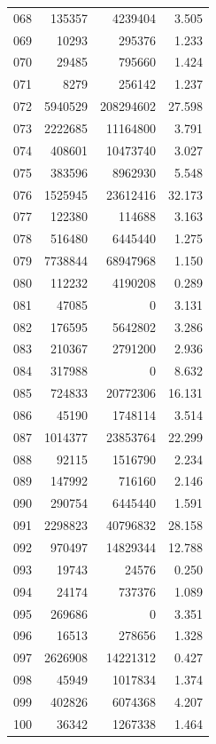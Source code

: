 \documentclass[anonymous,notoc]{gmcm2026}
\begin{document}
\begin{longtable}{lrrr}
068 & 135357 & 4239404 & 3.505 \\
069 & 10293 & 295376 & 1.233 \\
070 & 29485 & 795660 & 1.424 \\
071 & 8279 & 256142 & 1.237 \\
072 & 5940529 & 208294602 & 27.598 \\
073 & 2222685 & 11164800 & 3.791 \\
074 & 408601 & 10473740 & 3.027 \\
075 & 383596 & 8962930 & 5.548 \\
076 & 1525945 & 23612416 & 32.173 \\
077 & 122380 & 114688 & 3.163 \\
078 & 516480 & 6445440 & 1.275 \\
079 & 7738844 & 68947968 & 1.150 \\
080 & 112232 & 4190208 & 0.289 \\
081 & 47085 & 0 & 3.131 \\
082 & 176595 & 5642802 & 3.286 \\
083 & 210367 & 2791200 & 2.936 \\
084 & 317988 & 0 & 8.632 \\
085 & 724833 & 20772306 & 16.131 \\
086 & 45190 & 1748114 & 3.514 \\
087 & 1014377 & 23853764 & 22.299 \\
088 & 92115 & 1516790 & 2.234 \\
089 & 147992 & 716160 & 2.146 \\
090 & 290754 & 6445440 & 1.591 \\
091 & 2298823 & 40796832 & 28.158 \\
092 & 970497 & 14829344 & 12.788 \\
093 & 19743 & 24576 & 0.250 \\
094 & 24174 & 737376 & 1.089 \\
095 & 269686 & 0 & 3.351 \\
096 & 16513 & 278656 & 1.328 \\
097 & 2626908 & 14221312 & 0.427 \\
098 & 45949 & 1017834 & 1.374 \\
099 & 402826 & 6074368 & 4.207 \\
100 & 36342 & 1267338 & 1.464 \\
\end{longtable}
\end{document}
